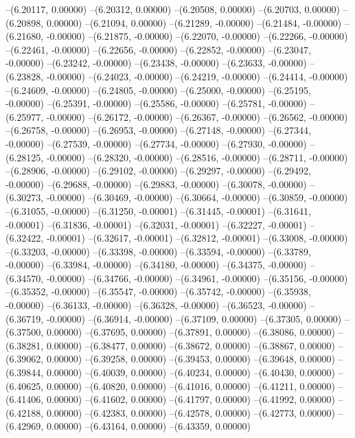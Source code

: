 --(6.20117, 0.00000)
--(6.20312, 0.00000)
--(6.20508, 0.00000)
--(6.20703, 0.00000)
--(6.20898, 0.00000)
--(6.21094, 0.00000)
--(6.21289, -0.00000)
--(6.21484, -0.00000)
--(6.21680, -0.00000)
--(6.21875, -0.00000)
--(6.22070, -0.00000)
--(6.22266, -0.00000)
--(6.22461, -0.00000)
--(6.22656, -0.00000)
--(6.22852, -0.00000)
--(6.23047, -0.00000)
--(6.23242, -0.00000)
--(6.23438, -0.00000)
--(6.23633, -0.00000)
--(6.23828, -0.00000)
--(6.24023, -0.00000)
--(6.24219, -0.00000)
--(6.24414, -0.00000)
--(6.24609, -0.00000)
--(6.24805, -0.00000)
--(6.25000, -0.00000)
--(6.25195, -0.00000)
--(6.25391, -0.00000)
--(6.25586, -0.00000)
--(6.25781, -0.00000)
--(6.25977, -0.00000)
--(6.26172, -0.00000)
--(6.26367, -0.00000)
--(6.26562, -0.00000)
--(6.26758, -0.00000)
--(6.26953, -0.00000)
--(6.27148, -0.00000)
--(6.27344, -0.00000)
--(6.27539, -0.00000)
--(6.27734, -0.00000)
--(6.27930, -0.00000)
--(6.28125, -0.00000)
--(6.28320, -0.00000)
--(6.28516, -0.00000)
--(6.28711, -0.00000)
--(6.28906, -0.00000)
--(6.29102, -0.00000)
--(6.29297, -0.00000)
--(6.29492, -0.00000)
--(6.29688, -0.00000)
--(6.29883, -0.00000)
--(6.30078, -0.00000)
--(6.30273, -0.00000)
--(6.30469, -0.00000)
--(6.30664, -0.00000)
--(6.30859, -0.00000)
--(6.31055, -0.00000)
--(6.31250, -0.00001)
--(6.31445, -0.00001)
--(6.31641, -0.00001)
--(6.31836, -0.00001)
--(6.32031, -0.00001)
--(6.32227, -0.00001)
--(6.32422, -0.00001)
--(6.32617, -0.00001)
--(6.32812, -0.00001)
--(6.33008, -0.00000)
--(6.33203, -0.00000)
--(6.33398, -0.00000)
--(6.33594, -0.00000)
--(6.33789, -0.00000)
--(6.33984, -0.00000)
--(6.34180, -0.00000)
--(6.34375, -0.00000)
--(6.34570, -0.00000)
--(6.34766, -0.00000)
--(6.34961, -0.00000)
--(6.35156, -0.00000)
--(6.35352, -0.00000)
--(6.35547, -0.00000)
--(6.35742, -0.00000)
--(6.35938, -0.00000)
--(6.36133, -0.00000)
--(6.36328, -0.00000)
--(6.36523, -0.00000)
--(6.36719, -0.00000)
--(6.36914, -0.00000)
--(6.37109, 0.00000)
--(6.37305, 0.00000)
--(6.37500, 0.00000)
--(6.37695, 0.00000)
--(6.37891, 0.00000)
--(6.38086, 0.00000)
--(6.38281, 0.00000)
--(6.38477, 0.00000)
--(6.38672, 0.00000)
--(6.38867, 0.00000)
--(6.39062, 0.00000)
--(6.39258, 0.00000)
--(6.39453, 0.00000)
--(6.39648, 0.00000)
--(6.39844, 0.00000)
--(6.40039, 0.00000)
--(6.40234, 0.00000)
--(6.40430, 0.00000)
--(6.40625, 0.00000)
--(6.40820, 0.00000)
--(6.41016, 0.00000)
--(6.41211, 0.00000)
--(6.41406, 0.00000)
--(6.41602, 0.00000)
--(6.41797, 0.00000)
--(6.41992, 0.00000)
--(6.42188, 0.00000)
--(6.42383, 0.00000)
--(6.42578, 0.00000)
--(6.42773, 0.00000)
--(6.42969, 0.00000)
--(6.43164, 0.00000)
--(6.43359, 0.00000)
